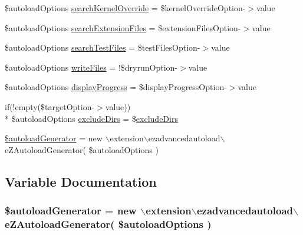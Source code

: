 \begin{DoxyCompactItemize}
\item 
\$autoload\-Options \hyperlink{ezpgenerateautoloads_8php_af86b9a19664645803f32b4d5bb872ff1}{search\-Kernel\-Override} = \$kernel\-Override\-Option-\/$>$value
\item 
\$autoload\-Options \hyperlink{ezpgenerateautoloads_8php_ae648f5335e57fa264ffaaf9d2fe4c61b}{search\-Extension\-Files} = \$extension\-Files\-Option-\/$>$value
\item 
\$autoload\-Options \hyperlink{ezpgenerateautoloads_8php_a3727c480754aa7c8b3dc7e8070ed1eb4}{search\-Test\-Files} = \$test\-Files\-Option-\/$>$value
\item 
\$autoload\-Options \hyperlink{ezpgenerateautoloads_8php_a210f8683b204a76199152312e3d9a177}{write\-Files} = !\$dryrun\-Option-\/$>$value
\item 
\$autoload\-Options \hyperlink{ezpgenerateautoloads_8php_aa79f55582aba2bd3eff4d3fa4b980a84}{display\-Progress} = \$display\-Progress\-Option-\/$>$value
\item 
if(!empty(\$target\-Option-\/$>$value)) \\*
\$autoload\-Options \hyperlink{ezpgenerateautoloads_8php_a52217447e9aa7d329a16ea69370b42a4}{exclude\-Dirs} = \$\hyperlink{ezpgenerateautoloads_8php_a52217447e9aa7d329a16ea69370b42a4}{exclude\-Dirs}
\item 
\hyperlink{ezpgenerateautoloads_8php_a86e95d193d321273aadaef08750683a8}{\$autoload\-Generator} = new $\backslash$extension$\backslash$ezadvancedautoload$\backslash$e\-Z\-Autoload\-Generator( \$autoload\-Options )
\end{DoxyCompactItemize}


\subsection{Variable Documentation}
\hypertarget{ezpgenerateautoloads_8php_a86e95d193d321273aadaef08750683a8}{
\subsubsection[{\$autoload\-Generator}]{\setlength{\rightskip}{0pt plus 5cm}\$autoload\-Generator = new $\backslash$extension$\backslash$ezadvancedautoload$\backslash$e\-Z\-Autoload\-Generator( \$autoload\-Options )}}\label{ezpgenerateautoloads_8php_a86e95d193d321273aadaef08750683a8}


